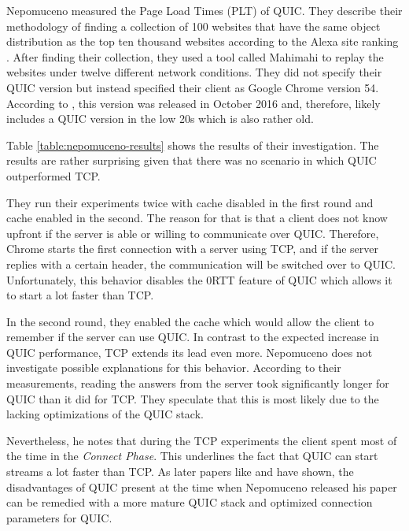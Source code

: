 \documentclass[conference]{IEEEtran}
\begin{document}
Nepomuceno \cite{Nepomuceno} measured the Page Load Times (PLT) of QUIC. They describe their methodology of finding a collection of 100 websites that have the same object distribution as the top ten thousand websites according to the Alexa site ranking \cite{AlexaRanking}. After finding their collection, they used a tool called Mahimahi to replay the websites under twelve different network conditions. They did not specify their QUIC version but instead specified their client as Google Chrome version 54. According to \cite{ChromeVersionHistory}, this version was released in October 2016 and, therefore, likely includes a QUIC version in the low 20s which is also rather old.

Table \ref{table:nepomuceno-results} shows the results of their investigation. The results are rather surprising given that there was no scenario in which QUIC outperformed TCP. 

They run their experiments twice with cache disabled in the first round and cache enabled in the second. The reason for that is that a client does not know upfront if the server is able or willing to communicate over QUIC. Therefore, Chrome starts the first connection with a server using TCP, and if the server replies with a certain header, the communication will be switched over to QUIC. Unfortunately, this behavior disables the 0RTT feature of QUIC which allows it to start a lot faster than TCP.

In the second round, they enabled the cache which would allow the client to remember if the server can use QUIC. In contrast to the expected increase in QUIC performance, TCP extends its lead even more. Nepomuceno does not investigate possible explanations for this behavior. According to their measurements, reading the answers from the server took significantly longer for QUIC than it did for TCP. They speculate that this is most likely due to the lacking optimizations of the QUIC stack.

Nevertheless, he notes that during the TCP experiments the client spent most of the time in the \textit{Connect Phase}. This underlines the fact that QUIC can start streams a lot faster than TCP. As later papers like \cite{Kakhki} and \cite{Kernel} have shown, the disadvantages of QUIC present at the time when Nepomuceno released his paper can be remedied with a more mature QUIC stack and optimized connection parameters for QUIC.
\end{document}
